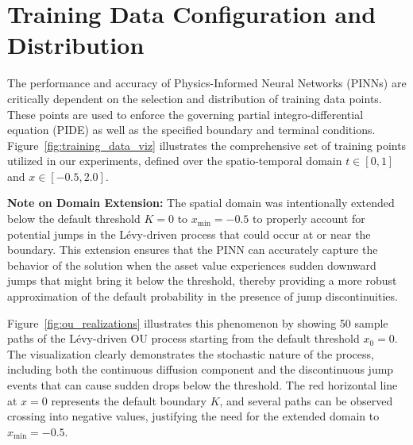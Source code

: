 \documentclass[11pt,twoside,openright]{report}
\begin{document}

\section{Training Data Configuration and Distribution}
\label{sec:training_data}

The performance and accuracy of Physics-Informed Neural Networks (PINNs) are critically dependent on the selection and distribution of training data points. These points are used to enforce the governing partial integro-differential equation (PIDE) as well as the specified boundary and terminal conditions. Figure~\ref{fig:training_data_viz} illustrates the comprehensive set of training points utilized in our experiments, defined over the spatio-temporal domain $t \in [0, 1]$ and $x \in [-0.5, 2.0]$.

\textbf{Note on Domain Extension:} The spatial domain was intentionally extended below the default threshold $K = 0$ to $x_{\min} = -0.5$ to properly account for potential jumps in the Lévy-driven process that could occur at or near the boundary. This extension ensures that the PINN can accurately capture the behavior of the solution when the asset value experiences sudden downward jumps that might bring it below the threshold, thereby providing a more robust approximation of the default probability in the presence of jump discontinuities.

Figure~\ref{fig:ou_realizations} illustrates this phenomenon by showing 50 sample paths of the Lévy-driven OU process starting from the default threshold $x_0 = 0$. The visualization clearly demonstrates the stochastic nature of the process, including both the continuous diffusion component and the discontinuous jump events that can cause sudden drops below the threshold. The red horizontal line at $x = 0$ represents the default boundary $K$, and several paths can be observed crossing into negative values, justifying the need for the extended domain to $x_{\min} = -0.5$.
\end{document}
